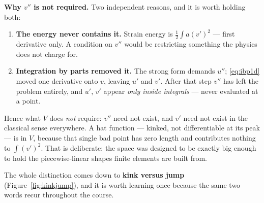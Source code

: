 \begin{intuition}
\medskip
\noindent\textbf{Why $v''$ is not required.}
Two independent reasons, and it is worth holding both:
\begin{enumerate}[label=(\roman*),leftmargin=1.8em,itemsep=2pt]
  \item \textbf{The energy never contains it.} Strain energy is
        $\tfrac12\int a(v')^{2}$ --- first derivative only. A condition on
        $v''$ would be restricting something the physics does not charge for.
  \item \textbf{Integration by parts removed it.} The strong form demands
        $u''$; \eqref{eq:ibp1d} moved one derivative onto $v$, leaving $u'$ and
        $v'$. After that step $v''$ has left the problem entirely, and $u'$,
        $v'$ appear \emph{only inside integrals} --- never evaluated at a point.
\end{enumerate}

\noindent
Hence what $V$ does \emph{not} require: $v''$ need not exist, and $v'$ need not
exist in the classical sense everywhere. A hat function --- kinked, not
differentiable at its peak --- is in $V$, because that single bad point has zero
length and contributes nothing to $\int(v')^{2}$. That is deliberate: the space
was designed to be exactly big enough to hold the piecewise-linear shapes
finite elements are built from.

The whole distinction comes down to \textbf{kink versus jump}
(Figure~\ref{fig:kinkjump}), and it is worth learning once because the same two
words recur throughout the course.
\end{intuition}


